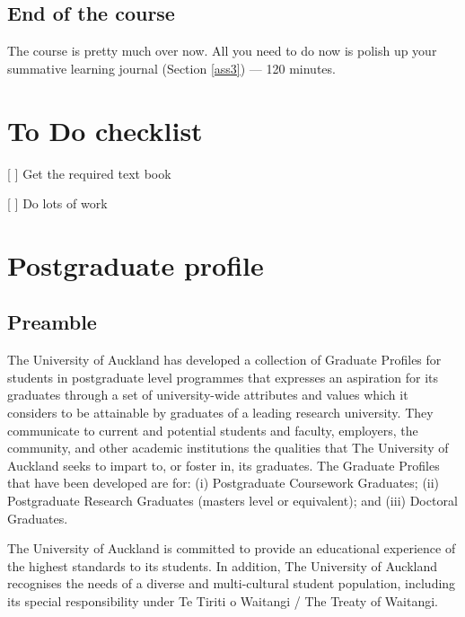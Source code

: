 \documentclass[]{book}
\theoremstyle{definition}
\theoremstyle{definition}
\theoremstyle{definition}
\theoremstyle{remark}
\begin{document}
\hypertarget{end-of-the-course}{%
\section*{End of the course}\label{end-of-the-course}}

The course is pretty much over now. All you need to do now is polish up
your summative learning journal (Section \ref{ass3}) --- 120 minutes.

\hypertarget{todo-checklist}{%
\chapter{To Do checklist}\label{todo-checklist}}

{[} {]} Get the required text book

{[} {]} Do lots of work

\hypertarget{appendix-appendix}{%
\appendix}


\hypertarget{profile}{%
\chapter{Postgraduate profile}\label{profile}}

\hypertarget{preamble}{%
\section{Preamble}\label{preamble}}

The University of Auckland has developed a collection of Graduate
Profiles for students in postgraduate level programmes that expresses an
aspiration for its graduates through a set of university-wide attributes
and values which it considers to be attainable by graduates of a leading
research university. They communicate to current and potential students
and faculty, employers, the community, and other academic institutions
the qualities that The University of Auckland seeks to impart to, or
foster in, its graduates. The Graduate Profiles that have been developed
are for: (i) Postgraduate Coursework Graduates; (ii) Postgraduate
Research Graduates (masters level or equivalent); and (iii) Doctoral
Graduates.

The University of Auckland is committed to provide an educational
experience of the highest standards to its students. In addition, The
University of Auckland recognises the needs of a diverse and
multi-cultural student population, including its special responsibility
under Te Tiriti o Waitangi / The Treaty of Waitangi.
\end{document}
